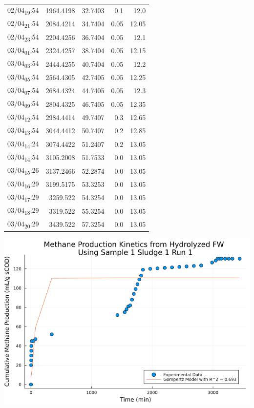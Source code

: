 \documentclass[11pt]{article}
\begin{document}
\begin{center}
\begin{tabular}{lrrrr}
02/04\textsubscript{19}:54 & 1964.4198 & 32.7403 & 0.1 & 12.0\\[0pt]
02/04\textsubscript{21}:54 & 2084.4214 & 34.7404 & 0.05 & 12.05\\[0pt]
02/04\textsubscript{23}:54 & 2204.4256 & 36.7404 & 0.05 & 12.1\\[0pt]
03/04\textsubscript{01}:54 & 2324.4257 & 38.7404 & 0.05 & 12.15\\[0pt]
03/04\textsubscript{03}:54 & 2444.4255 & 40.7404 & 0.05 & 12.2\\[0pt]
03/04\textsubscript{05}:54 & 2564.4305 & 42.7405 & 0.05 & 12.25\\[0pt]
03/04\textsubscript{07}:54 & 2684.4324 & 44.7405 & 0.05 & 12.3\\[0pt]
03/04\textsubscript{09}:54 & 2804.4325 & 46.7405 & 0.05 & 12.35\\[0pt]
03/04\textsubscript{12}:54 & 2984.4414 & 49.7407 & 0.3 & 12.65\\[0pt]
03/04\textsubscript{13}:54 & 3044.4412 & 50.7407 & 0.2 & 12.85\\[0pt]
03/04\textsubscript{14}:24 & 3074.4422 & 51.2407 & 0.2 & 13.05\\[0pt]
03/04\textsubscript{14}:54 & 3105.2008 & 51.7533 & 0.0 & 13.05\\[0pt]
03/04\textsubscript{15}:26 & 3137.2466 & 52.2874 & 0.0 & 13.05\\[0pt]
03/04\textsubscript{16}:29 & 3199.5175 & 53.3253 & 0.0 & 13.05\\[0pt]
03/04\textsubscript{17}:29 & 3259.522 & 54.3254 & 0.0 & 13.05\\[0pt]
03/04\textsubscript{18}:29 & 3319.522 & 55.3254 & 0.0 & 13.05\\[0pt]
03/04\textsubscript{20}:29 & 3439.522 & 57.3254 & 0.0 & 13.05\\[0pt]
\end{tabular}
\end{center}

\begin{center}
\includegraphics[width=.9\linewidth]{../plots/BMPs/Hydrolyzed FW/methane_kinetics_hydrolysate_1_s1_r1_min.png}
\end{center}
\end{document}

